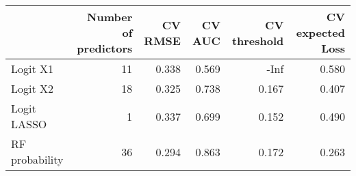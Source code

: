 
\begin{tabular}{lrrrrr}
\toprule
  & Number of predictors & CV RMSE & CV AUC & CV threshold & CV expected Loss\\
\midrule
Logit X1 & 11 & 0.338 & 0.569 & -Inf & 0.580\\
Logit X2 & 18 & 0.325 & 0.738 & 0.167 & 0.407\\
Logit LASSO & 1 & 0.337 & 0.699 & 0.152 & 0.490\\
RF probability & 36 & 0.294 & 0.863 & 0.172 & 0.263\\
\bottomrule
\end{tabular}